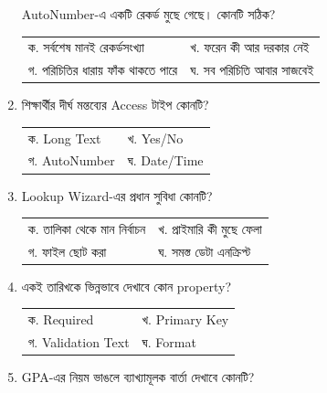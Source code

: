 \begin{multicols}{2}
\begin{enumerate}[resume]
\begin{minipage}[t]{\linewidth}
AutoNumber-এ একটি রেকর্ড মুছে গেছে। কোনটি সঠিক?
\par
\begin{tabularx}{\linewidth}{@{}X X@{}}
ক. সর্বশেষ মানই রেকর্ডসংখ্যা & খ. ফরেন কী আর দরকার নেই \\
গ. পরিচিতির ধারায় ফাঁক থাকতে পারে & ঘ. সব পরিচিতি আবার সাজবেই \\
\end{tabularx}
\end{minipage}
\vspace{1pt}
\item \begin{minipage}[t]{\linewidth}
শিক্ষার্থীর দীর্ঘ মন্তব্যের Access টাইপ কোনটি?
\par
\begin{tabularx}{\linewidth}{@{}X X@{}}
ক. Long Text & খ. Yes/No \\
গ. AutoNumber & ঘ. Date/Time \\
\end{tabularx}
\end{minipage}
\vspace{1pt}
\item \begin{minipage}[t]{\linewidth}
Lookup Wizard-এর প্রধান সুবিধা কোনটি?
\par
\begin{tabularx}{\linewidth}{@{}X X@{}}
ক. তালিকা থেকে মান নির্বাচন & খ. প্রাইমারি কী মুছে ফেলা \\
গ. ফাইল ছোট করা & ঘ. সমস্ত ডেটা এনক্রিপ্ট \\
\end{tabularx}
\end{minipage}
\vspace{1pt}
\item \begin{minipage}[t]{\linewidth}
একই তারিখকে ভিন্নভাবে দেখাবে কোন property?
\par
\begin{tabularx}{\linewidth}{@{}X X@{}}
ক. Required & খ. Primary Key \\
গ. Validation Text & ঘ. Format \\
\end{tabularx}
\end{minipage}
\vspace{1pt}
\item \begin{minipage}[t]{\linewidth}
GPA-এর নিয়ম ভাঙলে ব্যাখ্যামূলক বার্তা দেখাবে কোনটি?
\par
\begin{tabularx}{\linewidth}{@{}X X@{}}

\end{tabularx}
\end{minipage}
\end{enumerate}
\end{multicols}
